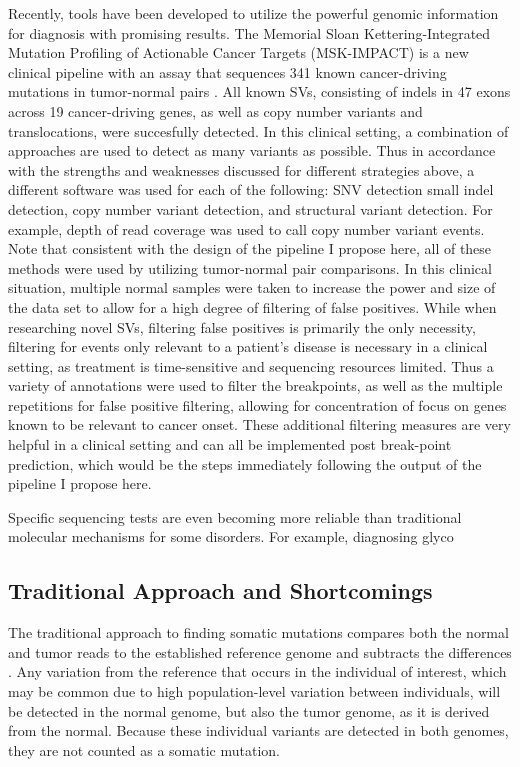 \documentclass{easychithesis}
\begin{document}
Recently, tools have been developed to utilize the powerful genomic information for diagnosis with promising results. The Memorial Sloan Kettering-Integrated Mutation Profiling of Actionable Cancer
Targets (MSK-IMPACT) is a new clinical pipeline with an assay that sequences 341 known cancer-driving mutations in tumor-normal pairs \cite{cheng2015memorial}. All known SVs, consisting of indels in 47 exons across 19 cancer-driving genes, as well as copy number variants and translocations, were succesfully detected. In this clinical setting, a combination of approaches are used to detect as many variants as possible. Thus in accordance with the strengths and weaknesses discussed for different strategies above, a different software was used for each of the following: SNV detection small indel detection, copy number variant detection, and structural variant detection. For example, depth of read coverage was used to call copy number variant events. Note that consistent with the design of the pipeline I propose here, all of these methods were used by utilizing tumor-normal pair comparisons. In this clinical situation, multiple normal samples were taken to increase the power and size of the data set to allow for a high degree of filtering of false positives. While when researching novel SVs, filtering false positives is primarily the only necessity, filtering for events only relevant to a patient's disease is necessary in a clinical setting, as treatment is time-sensitive and sequencing resources limited. Thus a variety of annotations were used to filter the breakpoints, as well as the multiple repetitions for false positive filtering, allowing for concentration of focus on genes known to be relevant to cancer onset. These additional filtering measures are very helpful in a clinical setting and can all be implemented post break-point prediction, which would be the steps immediately following the output of the pipeline I propose here. 

Specific sequencing tests are even becoming more reliable than traditional molecular mechanisms for some disorders. For example, diagnosing glyco


\subsection{Traditional Approach and Shortcomings}
The traditional approach to finding somatic mutations compares both the normal and tumor reads to the established reference genome and subtracts the differences \cite{schroder2014socrates, suzuki2011clipcrop, christoforides2013identification}. Any variation from the reference that occurs in the individual of interest, which may be common due to high population-level variation between individuals, will be detected in the normal genome, but also the tumor genome, as it is derived from the normal. Because these individual variants are detected in both genomes, they are not counted as a somatic mutation.
\end{document}
